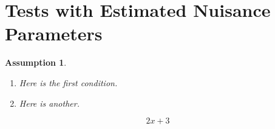 \documentclass{article}
\newtheorem{ass}{Assumption}
\begin{document}
\section{Tests with Estimated Nuisance Parameters}
\label{sec:testWithPihat}

\begin{ass}
  \label{ass:C}
  \begin{enumerate}
  \item\label{ass:C:First} Here is the first condition.
  \item\label{ass:C:Second} Here is another.
  \end{enumerate}
\end{ass}

\begin{equation}
  2x +3
\end{equation}
\end{document}
